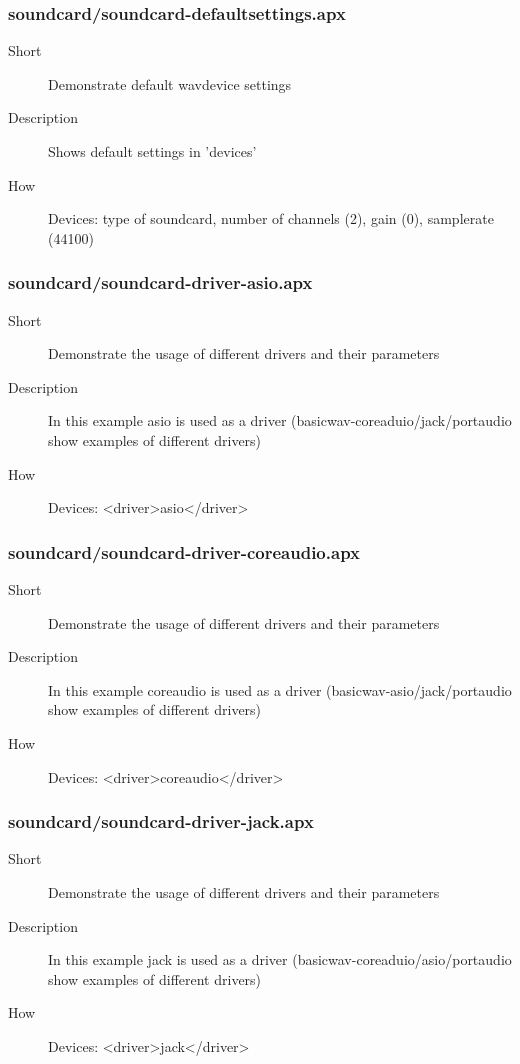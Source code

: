 \subsubsection{soundcard/soundcard-defaultsettings.apx}
\begin{description}
\item[Short] 
 Demonstrate default wavdevice settings
\item[Description] 
 Shows default settings in 'devices'
\item[How] 
 Devices: type of soundcard, number of channels (2), gain (0), samplerate (44100)
\end{description}

\subsubsection{soundcard/soundcard-driver-asio.apx}
\begin{description}
\item[Short] 
 Demonstrate the usage of different drivers and their parameters
\item[Description] 
 In this example asio is used as a driver (basicwav-coreaduio/jack/portaudio show examples of different drivers)
\item[How] 
 Devices: \textless{}driver\textgreater{}asio\textless{}/driver\textgreater{}
\end{description}

\subsubsection{soundcard/soundcard-driver-coreaudio.apx}
\begin{description}
\item[Short] 
 Demonstrate the usage of different drivers and their parameters
\item[Description] 
 In this example coreaudio is used as a driver (basicwav-asio/jack/portaudio show examples of different drivers)
\item[How] 
 Devices: \textless{}driver\textgreater{}coreaudio\textless{}/driver\textgreater{}
\end{description}

\subsubsection{soundcard/soundcard-driver-jack.apx}
\begin{description}
\item[Short] 
 Demonstrate the usage of different drivers and their parameters
\item[Description] 
 In this example jack is used as a driver (basicwav-coreaduio/asio/portaudio show examples of different drivers)
\item[How] 
 Devices: \textless{}driver\textgreater{}jack\textless{}/driver\textgreater{}
\end{description}

